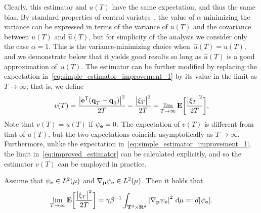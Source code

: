 \documentclass[11pt,a4paper]{article}
\begin{document}
Clearly, this estimator and $u(T)$ have the same expectation, and thus the same bias.
By standard properties of control variates~\cite{kroese2013handbook},
the value of $\alpha$ minimizing the variance can be expressed in terms of the variance of $u(T)$ and
the covariance between $u(T)$ and $\widehat u(T)$,
but for simplicity of the analysis we consider only the case $\alpha = 1$.
This is the variance-minimizing choice when~$\widehat u(T) = u(T)$,
and we demonstrate below that it yields good results so long as $\widehat u(T)$ is a good approximation of~$u(T)$.
The estimator can be further modified by replacing the expectation in~\eqref{eq:simple_estimator_improvement_1} by its value in the limit as $T \to \infty$;
that is, we define
\begin{equation}
    \label{eq:improved_estimator}
    v(T) =  \frac{\bigl\lvert \boldsymbol{\mathbf e}^\mathsf T(\boldsymbol{\mathbf q}_T - \boldsymbol{\mathbf q}_0) \bigr\rvert^2}{2T} - \frac{\bigl\lvert \xi_T \bigr\rvert^2}{2T} + \lim_{T \to \infty} \mathbf{E} \biggl[\frac{\bigl\lvert \xi_T \bigr\rvert^2}{2T}\biggr],
\end{equation}
Note that $v(T) = u(T)$ if $\psi_{\boldsymbol{\mathbf e}} = 0$.
The expectation of $v(T)$ is different from that of $u(T)$,
but the two expectations coincide asymptotically as $T \to \infty$.
Furthermore, unlike the expectation in~\eqref{eq:simple_estimator_improvement_1},
the limit in~\eqref{eq:improved_estimator} can be calculated explicitly,
and so the estimator $v(T)$ can be employed in practice.
\begin{lemma}
    \label{lemma:explicit_limit}
    Assume that $\psi_{\boldsymbol{\mathbf e}} \in L^2(\mu)$ and $\nabla_{\boldsymbol{\mathbf p}} \psi_{\boldsymbol{\mathbf e}} \in L^2(\mu)$.
    Then it holds that
    \begin{equation}
        \label{eq:explicit_limit}
        \lim_{T \to \infty} \expect \biggl[\frac{\bigl\lvert \xi_T \bigr\rvert^2}{2T}\biggr] = \gamma \beta^{-1} \int_{\torus^d \times \real^d} \abs{\grad_{\vect p} \psi_{\vect e}}^2 \, \d \mu =: d[\psi_{\vect e}].
    \end{equation}
\end{lemma}
\end{document}

